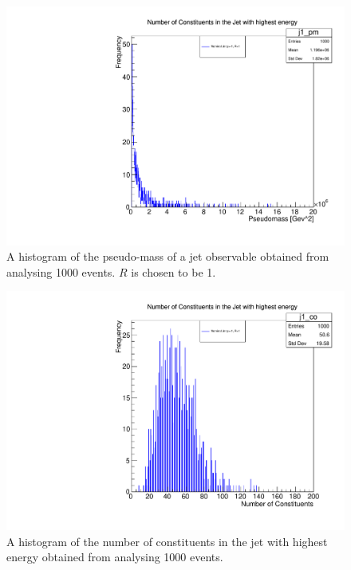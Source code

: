 \begin{figure}[hbtp]
\centering
\includegraphics[scale=.7]{images/myplot1.pdf}
\caption{A histogram of the pseudo-mass of a jet observable obtained from analysing 1000 events. $R$ is chosen to be 1.}
\end{figure}



\begin{figure}[hbtp]
\centering
\includegraphics[scale=.7]{images/myplot3.pdf}
\caption{A histogram of the number of constituents in the jet with highest energy obtained from analysing 1000 events.}
\end{figure}

